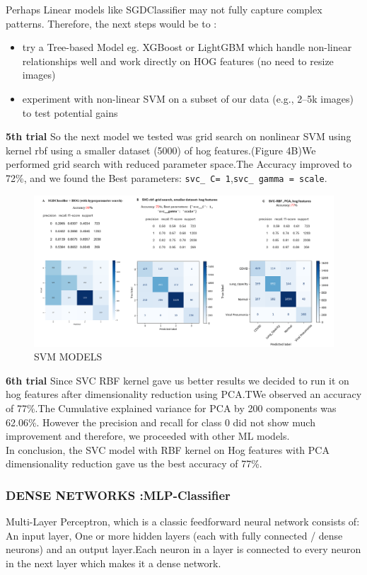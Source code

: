 \documentclass{article}
\begin{document}
Perhaps Linear models like SGDClassifier may not fully capture complex patterns.
Therefore, the next steps would be to :
\begin{itemize}
    \item try a Tree-based Model eg. XGBoost or LightGBM which handle non-linear relationships well and work directly on HOG features (no need to resize images)
    \item experiment with non-linear SVM on a subset of our data (e.g., 2–5k images) to test potential gains
\end{itemize}
\textbf{5th trial }So the next model we tested was grid search on nonlinear SVM using kernel rbf using a smaller dataset (5000) of hog features.(Figure 4B)We performed grid search with reduced parameter space.The Accuracy improved to 72\%, and we found the Best parameters: \texttt{svc\_ C= 1},\texttt {svc\_ gamma = scale}.
\\
\begin{figure}[ht] %
    \centering
    \includegraphics[width=1.0\linewidth]{svm ABC.png}
    \caption{SVM MODELS}
    \label{SVM MODELS}
\end{figure}
\textbf{6th trial }Since SVC\- RBF kernel gave us better results we decided to run it on hog features after dimensionality reduction using PCA.TWe observed an accuracy of 77\%.The Cumulative explained variance for PCA by 200 components was 62.06\%. However the precision and recall for class 0 did not show much improvement and therefore, we proceeded with other ML models.\\


In conclusion, the SVC model with RBF kernel on Hog features with PCA dimensionality reduction gave us the best accuracy of 77\%.

\subsubsection {DENSE NETWORKS :MLP-Classifier}
 Multi-Layer Perceptron, which is a classic feedforward neural network consists of: An input layer, One or more hidden layers (each with fully connected / dense neurons) and an output layer.Each neuron in a layer is connected to every neuron in the next layer which makes it a dense network.\\
 
\end{document}
